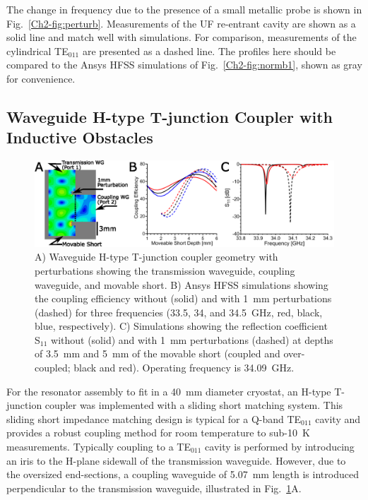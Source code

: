 The change in frequency due to the presence of a small metallic probe is shown in Fig.~\ref{Ch2-fig:perturb}. Measurements of the UF re-entrant \cylTE{} cavity are shown as a solid line and match well with simulations. For comparison, measurements of the cylindrical TE$_{011}$ are presented as a dashed line. The profiles here should be compared to the Ansys HFSS simulations of Fig.~\ref{Ch2-fig:normb1}, shown as gray for convenience. 


\subsection{Waveguide H-type T-junction Coupler with Inductive Obstacles}
\begin{figure}[htb]\centering
 \includegraphics[width=\textwidth]{Kapitel/Ch2-Images/04-CouplingPert.eps}
 \caption[Waveguide H-type T-junction coupler geometry.]{A) Waveguide H-type T-junction coupler geometry with perturbations showing the transmission waveguide, coupling waveguide, and movable short. B) Ansys HFSS simulations showing the coupling efficiency without (solid) and with 1~mm perturbations (dashed) for three frequencies (33.5, 34, and 34.5~GHz, red, black, blue, respectively). C) Simulations showing the reflection coefficient S$_{\text{11}}$ without (solid) and with 1~mm perturbations (dashed) at depths of 3.5~mm and 5~mm of the movable short (coupled and over-coupled; black and red). Operating frequency is 34.09~GHz.}
 \label{Ch2-fig:waveguide}
\end{figure}

For the resonator assembly to fit in a 40~mm diameter cryostat, an H-type T-junction coupler was implemented with a sliding short matching system. This sliding short impedance matching design is typical for a Q-band TE$_{011}$ cavity and provides a robust coupling method for room temperature to sub-10~K measurements. \cite{generalte011} Typically coupling to a TE$_{011}$ cavity is performed by introducing an iris to the H-plane sidewall of the transmission waveguide. However, due to the oversized end-sections, a coupling waveguide of 5.07~mm length is introduced perpendicular to the transmission waveguide, illustrated in Fig.~\ref{Ch2-fig:waveguide}A. 

